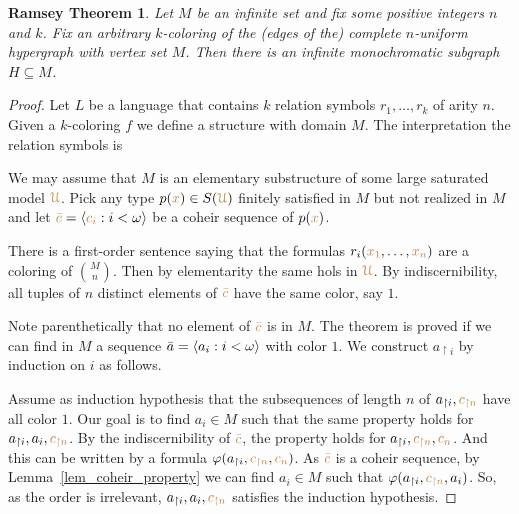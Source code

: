 \documentclass[creche.tex]{subfiles}
\begin{document}
\theoremstyle{mio}
\newtheorem{Ramsey}[thm]{Ramsey Theorem}
\begin{Ramsey}\label{thm_Ramsey}
Let $M$ be an infinite set and fix some positive integers $n$ and $k$.
Fix an arbitrary $k$-coloring of the (edges of the) complete $n$-uniform hypergraph with vertex set $M$.
Then there is an infinite monochromatic subgraph $H\subseteq M$.
\end{Ramsey}
\begin{proof}
Let $L$ be a language that contains $k$ relation symbols $r_1,\dots,r_k$ of arity $n$.
Given a $k$-coloring $f$ we define a structure with domain $M$.
The interpretation the relation symbols is




We may assume that $M$ is an elementary substructure of some large saturated model ${\color{brown}\EuScript U}$.
Pick any type $p({\color{brown} x})\in S({\color{brown}\EuScript U})$ finitely satisfied in $M$ but not realized in $M$ and let ${\color{brown}\bar c}=\langle{\color{brown}c_i}:i<\omega\rangle$ be a coheir sequence of $p({\color{brown} x})$.

There is a first-order sentence saying that the formulas $r_i({\color{brown} x_1},\dots,{\color{brown} x_n})$ are a coloring of ${M\choose n}$.
Then by elementarity the same hols in ${\color{brown}\EuScript U}$.
By indiscernibility,
all tuples of $n$ distinct elements of ${\color{brown}\bar c}$ have the same color, say $1$.


Note parenthetically that no element of ${\color{brown}\bar c}$ is in $M$.
The theorem is proved if we can find in $M$ a sequence $\bar a=\langle a_i:i<\omega\rangle$ with color $1$.
We construct $a_{\restriction i}$ by induction on $i$ as follows.

Assume as induction hypothesis that the subsequences of length $n$ of $a_{\restriction i},{\color{brown} c_{\restriction n}}$ have all color $1$.
Our goal is to find $a_i\in M$ such that the same property holds for $a_{\restriction i},a_i,{\color{brown} c_{\restriction n}}$.
By the indiscernibility of ${\color{brown}\bar c}$,
the property holds for  $a_{\restriction i},{\color{brown} c_{\restriction n}},{\color{brown}{c_n}}$.
And this can be written by a formula $\varphi(a_{\restriction i},{\color{brown} c_{\restriction n}},{\color{brown}{c_n}})$.
As ${\color{brown}\bar c}$ is a coheir sequence,
by Lemma~\ref{lem_coheir_property} we can find  $a_i\in M$ such that  $\varphi(a_{\restriction i},{\color{brown} c_{\restriction n}},a_i)$.
So,
as the order is irrelevant,
$a_{\restriction i},a_i,{\color{brown} c_{\restriction n}}$ satisfies the induction hypothesis.
\end{proof}
\end{document}
